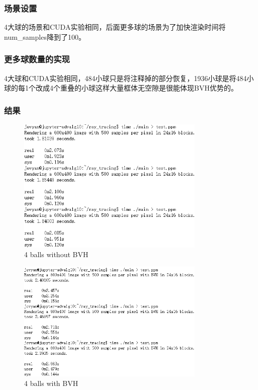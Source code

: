 \documentclass[UTF8, a4paper, 11pt]{article}
\begin{document}
\subsubsection{场景设置}
4大球的场景和CUDA实验相同，后面更多球的场景为了加快渲染时间将num\_samples降到了100。
\subsubsection{更多球数量的实现}
4大球和CUDA实验相同，484小球只是将注释掉的部分恢复，1936小球是将484小球的每1个改成4个重叠的小球这样大量框体无空隙是很能体现BVH优势的。
\subsubsection{结果}
\begin{figure}[H]
    \centering
    \includegraphics[width=0.8\textwidth]{24x16.png}
    \caption{4 balls without BVH}
\end{figure}
\begin{figure}[H]
    \centering
    \includegraphics[width=0.8\textwidth]{24x16_bvh.png}
    \caption{4 balls with BVH}
\end{figure}
\end{document}

